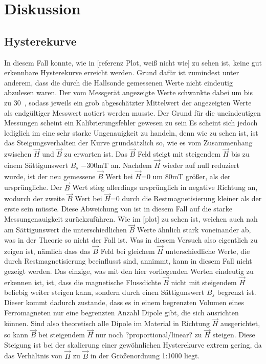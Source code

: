 \section{Diskussion}
\label{sec:Diskussion}

\subsection{Hysterekurve}
    In diesem Fall konnte, wie in [referenz Plot, weiß nicht wie] zu 
    sehen ist, keine gut erkennbare Hysterekurve erreicht werden. 
    Grund dafür ist zumindest unter anderem, dass die durch die Hallsonde
    gemessenen Werte nicht eindeutig abzulesen waren. Der vom Messgerät angezeigte
    Werte schwankte dabei um bis zu 30\si{\per\cent}, sodass jeweils ein grob abgeschätzter 
    Mittelwert der angezeigten Werte als endgültiger Messwert notiert werden musste.
    Der Grund für die uneindeutigen Messungen scheint ein Kalibrierungsfehler gewesen zu sein
    Es scheint sich jedoch lediglich im eine sehr starke Ungenauigkeit zu handeln, denn wie 
    zu sehen ist, ist das Steigungsverhalten der Kurve grundsätzlich so, wie es vom Zusammenhang 
    zwischen $\vec H$ und $\vec B$ zu erwarten ist. Das $\vec B$ Feld steigt mit steigendem $\vec H$
    bis zu einem Sättigunswert $B_s$ \approx $-300\si{\milli\tesla}$ an. Nachdem $\vec H$ wieder
    auf null reduziert wurde, ist der neu gemessene $\vec B$ Wert bei $\vec H$=0 um 80\si{\milli\tesla} 
    größer, als der ursprüngliche. Der $\vec B$ Wert stieg allerdings ursprünglich in negative Richtung an,
    wodurch der zweite $\vec B$ Wert bei $\vec H$=0 durch die Restmagnetisierung kleiner als der erste sein müsste.
    Diese Abweichung von ist in diesem Fall auf die starke Messungenauigkeit zurückzuführen. Wie im [plot] zu sehen ist,
    weichen auch nah am Sättigunswert die unterschiedlichen $\vec B$ Werte ähnlich stark voneinander ab, was in der Theorie
    so nicht der Fall ist. Was in diesem Versuch also eigentlich zu zeigen ist, nämlich dass das $\vec B$ Feld bei gleichem
    $\vec H$ unterschiedliche Werte, die durch Restmagnetisierung beeinflusst sind, annimmt, kann in diesem Fall nicht gezeigt
    werden. Das einzige, was mit den hier vorliegenden Werten eindeutig zu erkennen ist, ist, dass die magnetische 
    Flussdichte $\vec B$ nicht mit steigendem $\vec H$ beliebig weiter steigen kann, sondern durch einen Sättigunswert $B_s$
    begrenzt ist. Dieser kommt dadurch zustande, dass es in einem begrenzten Volumen eines Ferromagneten nur eine begrenzten
    Anzahl Dipole gibt, die sich ausrichten können. Sind also theoretisch alle Dipole im Material in Richtung $\vec H$
    ausgerichtet, so kann $\vec B$ bei steigendem $\vec H$ nur noch ?proportional/linear? zu $\vec H$ steigen. Diese Steigung ist
    bei der skalierung einer gewöhnlichen Hysterekurve extrem gering, da das Verhältnis von $\vec H$ zu $\vec B$ in der 
    Größenordnung 1:1000 liegt. %
